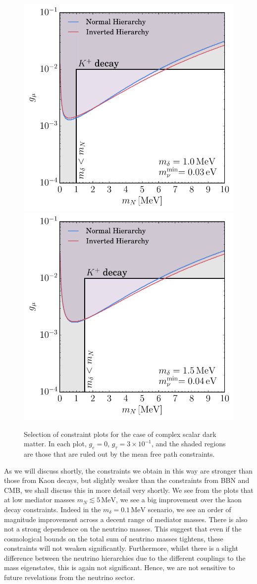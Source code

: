 \documentclass[11pt]{article}
\numberwithin{equation}{section}
\numberwithin{figure}{section}
\numberwithin{table}{section}
\begin{document}
\begin{figure}[t]
 \includegraphics[width=.48\textwidth]{8.pdf}\quad
 \includegraphics[width=.48\textwidth]{11.pdf}
 \caption{Selection of constraint plots for the case of complex scalar dark matter. In each plot, $g_e = 0$, $g_\tau = 3 \times 10^{-1}$, and the shaded regions are those that are ruled out by the mean free path constraints.}
 \label{fig:main}
\end{figure}
\noindent As we will discuss shortly, the constraints we obtain in this way are stronger than those from Kaon decays, but slightly weaker than the constraints from BBN and CMB, we shall discuss this in more detail very shortly.  We see from the plots that at low mediator masses $m_N \lesssim 5\, \textrm{MeV}$, we see a big improvement over the kaon decay constraints. Indeed in the $m_\delta = 0.1\,\textrm{MeV}$ scenario, we see an order of magnitude improvement across a decent range of mediator masses. There is also not a strong dependence on the neutrino masses. This suggest that even if the cosmological bounds on the total sum of neutrino masses tightens, these constraints will not weaken significantly. Furthermore, whilst there is a slight difference between the neutrino hierarchies due to the different couplings to the mass eigenstates, this is again not significant. Hence, we are not sensitive to future revelations from the neutrino sector.
\end{document}
